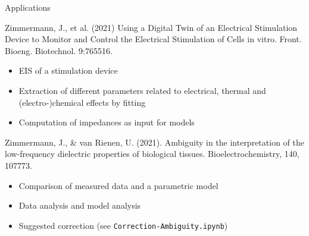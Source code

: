 \documentclass[11pt]{beamer}
\begin{document}
\begin{frame}{Applications}
\begin{block}{\tiny Zimmermann, J., et al. (2021) Using a Digital Twin of an Electrical Stimulation Device to Monitor and Control the Electrical Stimulation of Cells in vitro. Front. Bioeng. Biotechnol. 9:765516.}
\begin{itemize}
\item EIS of a stimulation device
\item Extraction of different parameters related to electrical, thermal and (electro-)chemical effects by fitting
\item Computation of impedances as input for models
\end{itemize}
\end{block}
\begin{block}{\tiny Zimmermann, J., \& van Rienen, U. (2021). Ambiguity in the interpretation of the low-frequency dielectric properties of biological tissues. Bioelectrochemistry, 140, 107773.}
\begin{itemize}
\item Comparison of measured data and a parametric model
\item Data analysis and model analysis
\item Suggested correction (see \lstinline{Correction-Ambiguity.ipynb})
\end{itemize}
\end{block}
\end{frame}
\end{document}
